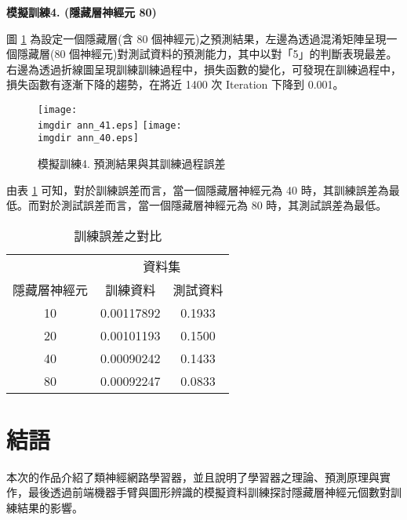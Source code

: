 \textbf{\large 模擬訓練4. (隱藏層神經元 80)}

圖 \ref{fig:ann_20} 為設定一個隱藏層(含 80 個神經元)之預測結果，左邊為透過混淆矩陣呈現一個隱藏層(80 個神經元)對測試資料的預測能力，其中以對「5」的判斷表現最差。右邊為透過折線圖呈現訓練訓練過程中，損失函數的變化，可發現在訓練過程中，損失函數有逐漸下降的趨勢，在將近 1400 次 Iteration 下降到 0.001。

\begin{figure}[H]
	\centering
	\texttt{[image: \\imgdir ann\_41.eps]}
	\texttt{[image: \\imgdir ann\_40.eps]}
	\caption{模擬訓練4. 預測結果與其訓練過程誤差}
	 \label{fig:ann_20}
\end{figure}

由表 \ref{tb:ann_4} 可知，對於訓練誤差而言，當一個隱藏層神經元為 40 時，其訓練誤差為最低。而對於測試誤差而言，當一個隱藏層神經元為 80 時，其測試誤差為最低。

\begin{table}[H] 
\centering
\caption{訓練誤差之對比}\label{tb:ann_4}
\tabcolsep=12pt
\begin{tabular}{ccc} 
\toprule
& \multicolumn{2}{c}{資料集}\\
\cmidrule(l){2-3}
隱藏層神經元 & 訓練資料 & 測試資料 \\[3pt]
\midrule
10 & 0.00117892 & 0.1933 \\[3pt]
20 & 0.00101193 & 0.1500 \\[3pt]
40 & \cellcolor{red!25}0.00090242 & 0.1433 \\[3pt]
80 & 0.00092247 & \cellcolor{red!25}0.0833 \\
\bottomrule
\end{tabular}
\end{table}
\section{結語}
本次的作品介紹了類神經網路學習器，並且說明了學習器之理論、預測原理與實作，最後透過前端機器手臂與圖形辨識的模擬資料訓練探討隱藏層神經元個數對訓練結果的影響。
%